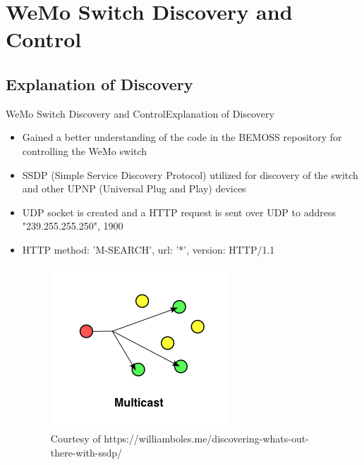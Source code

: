 \documentclass{beamer}
\begin{document}
\section{WeMo Switch Discovery and Control}
\subsection{Explanation of Discovery}
\begin{frame}{WeMo Switch Discovery and Control}{Explanation of Discovery}
\begin{itemize}
\item Gained a better understanding of the code in the BEMOSS repository for controlling the WeMo switch
\item SSDP (Simple Service Discovery Protocol) utilized for discovery of the switch and other UPNP (Universal Plug and Play) devices
\item UDP socket is created and a HTTP request is sent over UDP to address "239.255.255.250", 1900
\item HTTP method: 'M-SEARCH', url: '*', version: HTTP/1.1
\begin{figure}
\includegraphics[scale=0.3]{figs/img/multicast_routing_diagram}
\caption{Courtesy of https://williamboles.me/discovering-whats-out-there-with-ssdp/}
\end{figure}
\end{itemize}
\end{frame}
\end{document}
